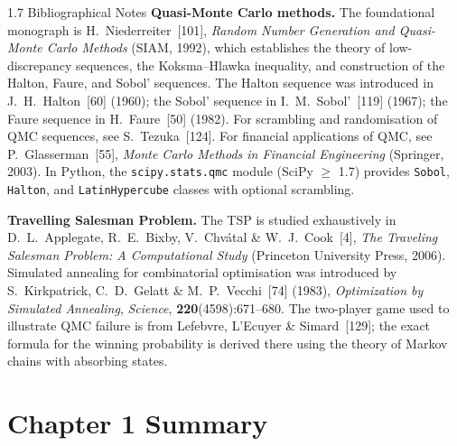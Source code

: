 \documentclass[aspectratio=169,10pt]{beamer}
\begin{document}
\begin{frame}[allowframebreaks]{1.7 Bibliographical Notes}
  \textbf{Quasi-Monte Carlo methods.}  The foundational monograph is
  H.~Niederreiter~[101], \textit{Random Number Generation and Quasi-Monte Carlo
  Methods} (SIAM, 1992), which establishes the theory of low-discrepancy
  sequences, the Koksma--Hlawka inequality, and construction of the Halton,
  Faure, and Sobol' sequences.  The Halton sequence was introduced in
  J.~H.~Halton~[60] (1960); the Sobol' sequence in I.~M.~Sobol'~[119] (1967);
  the Faure sequence in H.~Faure~[50] (1982).  For scrambling and randomisation
  of QMC sequences, see S.~Tezuka~[124].  For financial applications of QMC,
  see P.~Glasserman~[55], \textit{Monte Carlo Methods in Financial Engineering}
  (Springer, 2003).  In Python, the \texttt{scipy.stats.qmc} module (SciPy
  $\ge$ 1.7) provides \texttt{Sobol}, \texttt{Halton}, and
  \texttt{LatinHypercube} classes with optional scrambling.

  \textbf{Travelling Salesman Problem.}  The TSP is studied exhaustively in
  D.~L.~Applegate, R.~E.~Bixby, V.~Chv\'atal \& W.~J.~Cook~[4],
  \textit{The Traveling Salesman Problem: A Computational Study} (Princeton
  University Press, 2006).  Simulated annealing for combinatorial optimisation
  was introduced by S.~Kirkpatrick, C.~D.~Gelatt \& M.~P.~Vecchi~[74] (1983),
  \textit{Optimization by Simulated Annealing}, \textit{Science},
  \textbf{220}(4598):671--680.  The two-player game used to illustrate QMC
  failure is from Lefebvre, L'Ecuyer \& Simard~[129]; the exact formula for the
  winning probability is derived there using the theory of Markov chains with
  absorbing states.

\end{frame}

\section*{Chapter 1 Summary}
\end{document}
